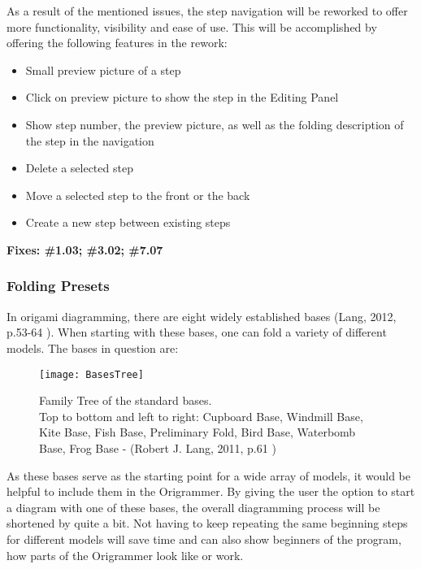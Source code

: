 As a result of the mentioned issues, the step navigation will be reworked to offer more functionality, visibility and ease of use. This will be accomplished by offering the following features in the rework:
\newpage
\begin{itemize}
\item Small preview picture of a step
\item Click on preview picture to show the step in the Editing Panel
\item Show step number, the preview picture, as well as the folding description of the step in the navigation
\item Delete a selected step
\item Move a selected step to the front or the back
\item Create a new step between existing steps
\end{itemize}

\textbf{Fixes: \#1.03; \#3.02;   \#7.07}

\subsubsection{Folding Presets}
In origami diagramming, there are eight widely established bases (Lang, 2012, p.53-64 \cite{DesignSecrets}). When starting with these bases, one can fold a variety of different models. The bases in question are:
 
 \begin{figure}[htbp]
	\centering
	\texttt{[image: BasesTree]}
	\caption[Family Tree of the standard bases.\\
	Top to bottom and left to right:  Cupboard Base, Windmill Base, Kite Base, Fish Base, Preliminary Fold, Bird Base, Waterbomb Base, Frog Base]{Family Tree of the standard bases.\\
	Top to bottom and left to right:  Cupboard Base, Windmill Base, Kite Base, Fish Base, Preliminary Fold, Bird Base, Waterbomb Base, Frog Base - (Robert J. Lang, 2011, p.61 \cite{BaseTree})}
	\label{fig:basesTree}
\end{figure}
\newpage
\noindent As these bases serve as the starting point for a wide array of models, it would be helpful to include them in the Origrammer. By giving the user the option to start a diagram with one of these bases, the overall diagramming process will be shortened by quite a bit. Not having to keep repeating the same beginning steps for different models will save time and can also show beginners of the program, how parts of the Origrammer look like or work.

